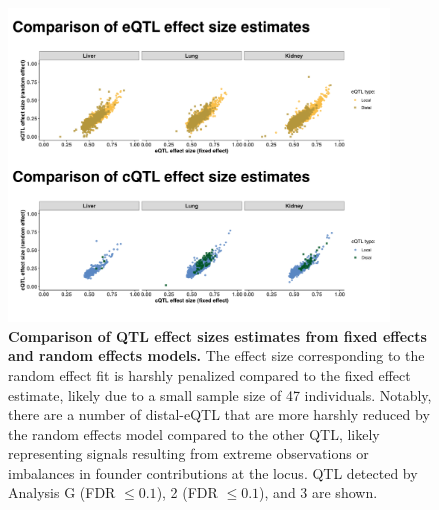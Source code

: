 \documentclass[9pt,twocolumn,twoside]{gsajnl}
\begin{document}
\begin{figure}[hp]
\renewcommand{\familydefault}{\sfdefault}\normalfont
\centering
\includegraphics[width=0.9\textwidth, trim={0in 0in 0in 0in}, clip]{figs/fixefvsranef_qtl.pdf}
\caption{\textbf{Comparison of QTL effect sizes estimates from fixed effects and random effects models.} 
The effect size corresponding to the random effect fit is harshly penalized compared to the fixed effect estimate, likely due to a small sample size of 47 individuals. Notably, there are a number of distal-eQTL that are more harshly reduced by the random effects model compared to the other QTL, likely representing signals resulting from extreme observations or imbalances in founder contributions at the locus. QTL detected by Analysis G (FDR $\le 0.1$), 2 (FDR $\le 0.1$), and 3 are shown.
\label{fig:qtl_effect_size_fixefvsranef}}
\end{figure}
\end{document}
